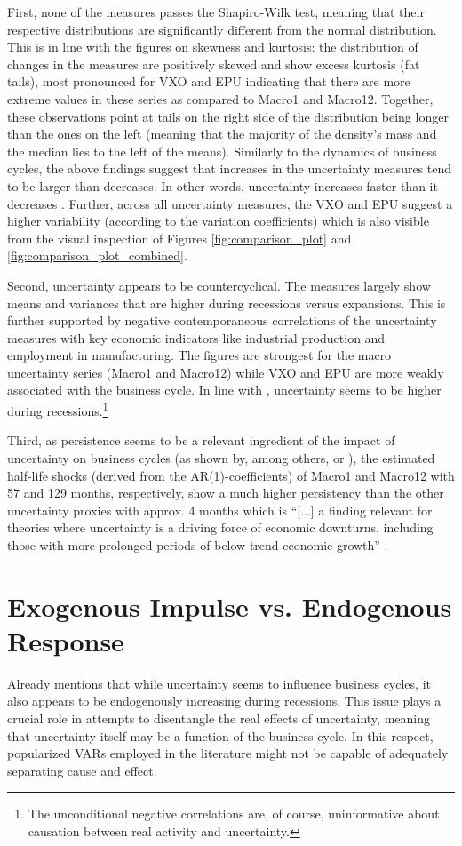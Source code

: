 \documentclass[a4paper,11pt,listof=nochaptergap,oneside,pointednumbers,bibtotoc,bigheadings,liststotoc,hidelinks]{scrbook}
\theoremstyle{mysatz}
\theoremstyle{mydefinition}
\theoremstyle{mytheorem}
\theoremstyle{mybemerkung}
\begin{document}
First, none of the measures passes the Shapiro-Wilk test, meaning that their respective distributions are significantly different from the normal distribution. This is in line with the figures on skewness and kurtosis: the distribution of changes in the measures are positively skewed and show excess kurtosis (fat tails), most pronounced for VXO and EPU indicating that there are more extreme values in these series as compared to Macro1 and Macro12. Together, these observations point at tails on the right side of the distribution being longer than the ones on the left (meaning that the majority of the density's mass and the median lies to the left of the means). Similarly to the dynamics of business cycles, the above findings suggest that increases in the uncertainty measures tend to be larger than decreases. In other words, uncertainty increases faster than it decreases \citep{moore:17}. Further, across all uncertainty measures, the VXO and EPU suggest a higher variability (according to the variation coefficients) which is also visible from the visual inspection of Figures \ref{fig:comparison_plot} and \ref{fig:comparison_plot_combined}.

Second, uncertainty appears to be countercyclical. The measures largely show means and variances that are higher during recessions versus expansions. This is further supported by negative contemporaneous correlations of the uncertainty measures with key economic indicators like industrial production and employment in manufacturing. The figures are strongest for the macro uncertainty series (Macro1 and Macro12) while VXO and EPU are more weakly associated with the business cycle. In line with \citet{bloom:14}, uncertainty seems to be higher during recessions.\footnote{The unconditional negative correlations are, of course, uninformative about causation between real activity and uncertainty.}


Third, as persistence seems to be a relevant ingredient of the impact of uncertainty on business cycles (as shown by, among others, \citet{schaal:17} or \citet{juradoetal:15}), the estimated half-life shocks (derived from the AR(1)-coefficients) of Macro1 and Macro12 with 57 and 129 months, respectively, show a much higher persistency than the other uncertainty proxies with approx. 4 months which is ``[...] a finding relevant for theories where uncertainty is a driving force of economic downturns, including those with more prolonged periods of below-trend economic growth'' \citep[p. 1193]{juradoetal:15}.


\section{Exogenous Impulse vs. Endogenous Response}
\label{sec:exoEndoJuradoetal}
Already \citet{bloom:14} mentions that while uncertainty seems to influence business cycles, it also appears to be endogenously increasing during recessions. This issue plays a crucial role in attempts to disentangle the real effects of uncertainty, meaning that uncertainty itself may be a function of the business cycle. In this respect, popularized VARs employed in the literature might not be capable of adequately separating cause and effect.
\end{document}
